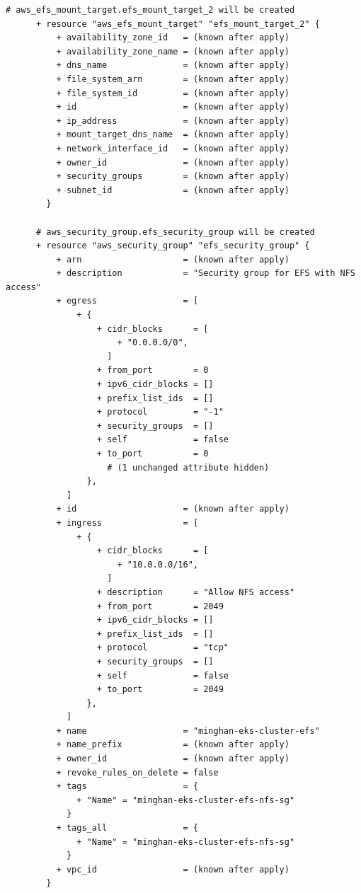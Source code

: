 \begin{lstlisting}[caption={terraform plan output for \texttt{cloudkube} provisioning}, breaklines=true, breakatwhitespace=false]
      # aws_efs_mount_target.efs_mount_target_2 will be created
      + resource "aws_efs_mount_target" "efs_mount_target_2" {
          + availability_zone_id   = (known after apply)
          + availability_zone_name = (known after apply)
          + dns_name               = (known after apply)
          + file_system_arn        = (known after apply)
          + file_system_id         = (known after apply)
          + id                     = (known after apply)
          + ip_address             = (known after apply)
          + mount_target_dns_name  = (known after apply)
          + network_interface_id   = (known after apply)
          + owner_id               = (known after apply)
          + security_groups        = (known after apply)
          + subnet_id              = (known after apply)
        }
    
      # aws_security_group.efs_security_group will be created
      + resource "aws_security_group" "efs_security_group" {
          + arn                    = (known after apply)
          + description            = "Security group for EFS with NFS access"
          + egress                 = [
              + {
                  + cidr_blocks      = [
                      + "0.0.0.0/0",
                    ]
                  + from_port        = 0
                  + ipv6_cidr_blocks = []
                  + prefix_list_ids  = []
                  + protocol         = "-1"
                  + security_groups  = []
                  + self             = false
                  + to_port          = 0
                    # (1 unchanged attribute hidden)
                },
            ]
          + id                     = (known after apply)
          + ingress                = [
              + {
                  + cidr_blocks      = [
                      + "10.0.0.0/16",
                    ]
                  + description      = "Allow NFS access"
                  + from_port        = 2049
                  + ipv6_cidr_blocks = []
                  + prefix_list_ids  = []
                  + protocol         = "tcp"
                  + security_groups  = []
                  + self             = false
                  + to_port          = 2049
                },
            ]
          + name                   = "minghan-eks-cluster-efs"
          + name_prefix            = (known after apply)
          + owner_id               = (known after apply)
          + revoke_rules_on_delete = false
          + tags                   = {
              + "Name" = "minghan-eks-cluster-efs-nfs-sg"
            }
          + tags_all               = {
              + "Name" = "minghan-eks-cluster-efs-nfs-sg"
            }
          + vpc_id                 = (known after apply)
        }
    

\end{lstlisting}
